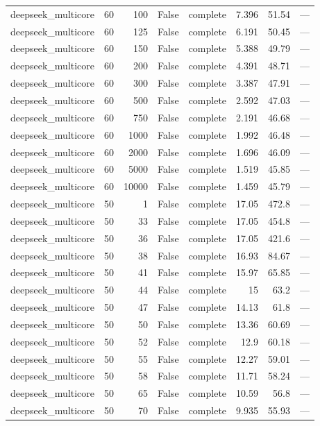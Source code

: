 \begin{tabular}{lrrrlrrl}
deepseek\_multicore & 60 & 100 & False & complete & 7.396 & 51.54 & — \\
deepseek\_multicore & 60 & 125 & False & complete & 6.191 & 50.45 & — \\
deepseek\_multicore & 60 & 150 & False & complete & 5.388 & 49.79 & — \\
deepseek\_multicore & 60 & 200 & False & complete & 4.391 & 48.71 & — \\
deepseek\_multicore & 60 & 300 & False & complete & 3.387 & 47.91 & — \\
deepseek\_multicore & 60 & 500 & False & complete & 2.592 & 47.03 & — \\
deepseek\_multicore & 60 & 750 & False & complete & 2.191 & 46.68 & — \\
deepseek\_multicore & 60 & 1000 & False & complete & 1.992 & 46.48 & — \\
deepseek\_multicore & 60 & 2000 & False & complete & 1.696 & 46.09 & — \\
deepseek\_multicore & 60 & 5000 & False & complete & 1.519 & 45.85 & — \\
deepseek\_multicore & 60 & 10000 & False & complete & 1.459 & 45.79 & — \\
deepseek\_multicore & 50 & 1 & False & complete & 17.05 & 472.8 & — \\
deepseek\_multicore & 50 & 33 & False & complete & 17.05 & 454.8 & — \\
deepseek\_multicore & 50 & 36 & False & complete & 17.05 & 421.6 & — \\
deepseek\_multicore & 50 & 38 & False & complete & 16.93 & 84.67 & — \\
deepseek\_multicore & 50 & 41 & False & complete & 15.97 & 65.85 & — \\
deepseek\_multicore & 50 & 44 & False & complete & 15 & 63.2 & — \\
deepseek\_multicore & 50 & 47 & False & complete & 14.13 & 61.8 & — \\
deepseek\_multicore & 50 & 50 & False & complete & 13.36 & 60.69 & — \\
deepseek\_multicore & 50 & 52 & False & complete & 12.9 & 60.18 & — \\
deepseek\_multicore & 50 & 55 & False & complete & 12.27 & 59.01 & — \\
deepseek\_multicore & 50 & 58 & False & complete & 11.71 & 58.24 & — \\
deepseek\_multicore & 50 & 65 & False & complete & 10.59 & 56.8 & — \\
deepseek\_multicore & 50 & 70 & False & complete & 9.935 & 55.93 & — \\

\end{tabular}
